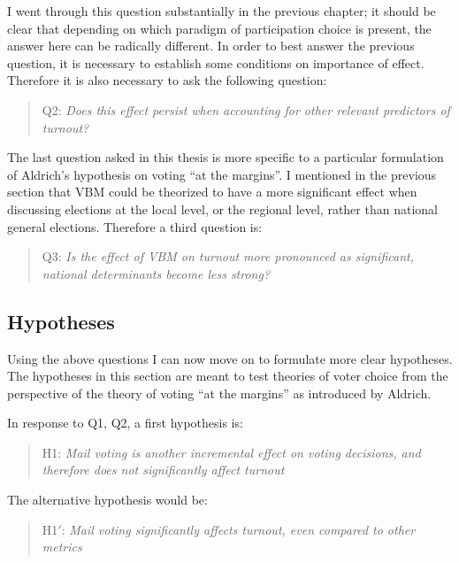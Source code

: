 \documentclass[12pt,twoside]{reedthesis}
\begin{document}
  I went through this question substantially in the previous chapter; it
  should be clear that depending on which paradigm of participation choice
  is present, the answer here can be radically different. In order to best
  answer the previous question, it is necessary to establish some
  conditions on importance of effect. Therefore it is also necessary to
  ask the following question:
  
  \begin{quotation}   
  Q2: \textit{Does this effect persist when accounting for other relevant predictors of turnout?}
  \end{quotation}
  
  The last question asked in this thesis is more specific to a particular
  formulation of Aldrich's hypothesis on voting ``at the margins''. I
  mentioned in the previous section that VBM could be theorized to have a
  more significant effect when discussing elections at the local level, or
  the regional level, rather than national general elections. Therefore a
  third question is:
  
  \begin{quotation}   
  Q3: \textit{Is  the  effect  of  VBM on turnout more  pronounced as significant, national determinants become less strong?}
  \end{quotation}
  
  \subsection{Hypotheses}\label{hypotheses-1}
  
  Using the above questions I can now move on to formulate more clear
  hypotheses. The hypotheses in this section are meant to test theories of
  voter choice from the perspective of the theory of voting ``at the
  margins'' as introduced by Aldrich.
  
  In response to Q1, Q2, a first hypothesis is:
  
  \begin{quotation}  
  H1: \textit{Mail voting is another incremental effect on voting decisions, and therefore
  does not significantly affect turnout}
  \end{quotation}
  
  The alternative hypothesis would be:
  
  \begin{quotation}  
  H1$'$: \textit{Mail  voting  significantly  affects  turnout,  even  compared  to  other  metrics}
  \end{quotation}
  
\end{document}
